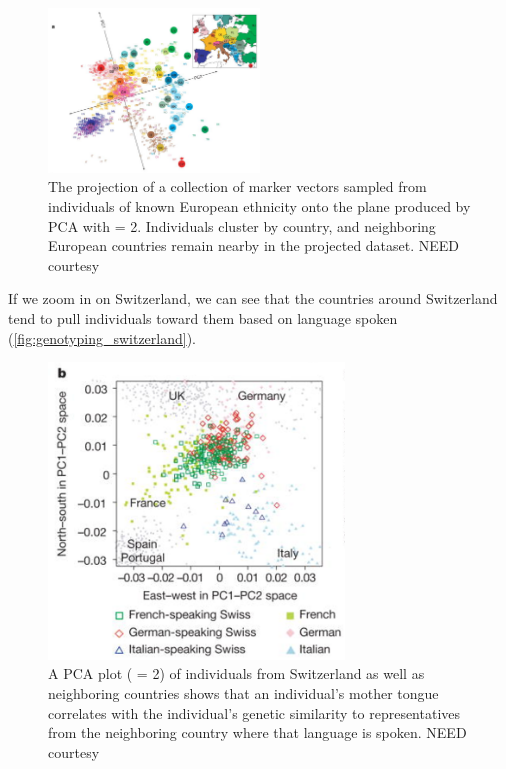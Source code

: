 \begin{figure}[h]
\centering
\mySfFamily
\includegraphics[width = 0.5\textwidth]{../images/genotyping_europe.png}
\caption{The projection of a collection of marker vectors sampled from individuals of known European ethnicity onto the plane produced by PCA with  = 2. Individuals cluster by country, and neighboring European countries remain nearby in the projected dataset. NEED courtesy}
\label{fig:genotyping_europe}
\end{figure}

If we zoom in on Switzerland, we can see that the countries around Switzerland tend to pull individuals toward them based on language spoken (\autoref{fig:genotyping_switzerland}).

\begin{figure}[h]
\centering
\mySfFamily
\includegraphics[width = 0.7\textwidth]{../images/genotyping_switzerland.png}
\caption{A PCA plot ( = 2) of individuals from Switzerland as well as neighboring countries shows that an individual's mother tongue correlates with the individual's genetic similarity to representatives from the neighboring country where that language is spoken. NEED courtesy}
\label{fig:genotyping_switzerland}
\end{figure}

